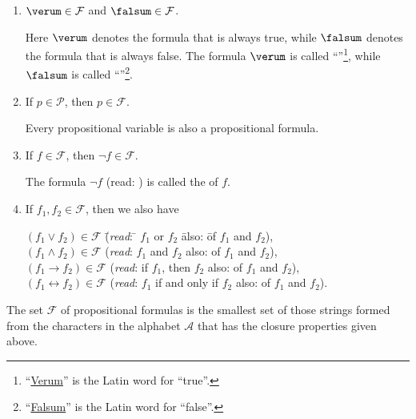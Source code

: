 \begin{enumerate}
\item $\verum \in \mathcal{F}$ and $\falsum \in \mathcal{F}$.

      Here $\verum$   denotes the formula that is always true, while $\falsum$
        denotes the formula that is always false.
      The formula $\verum$ is called
      ``''\footnote{``\href{https://translate.google.com/?sl=la&tl=en&text=falsum&op=translate&hl=en}{Verum}''
        is the Latin word for ``true''.},  while $\falsum$ is called 
      ``''\footnote{``\href{https://translate.google.com/?sl=la&tl=en&text=falsum&op=translate&hl=en}{Falsum}''
        is the Latin word for ``false''.}.  
\item If $p \in \mathcal{P}$, then  $p \in \mathcal{F}$.

      Every propositional variable is also a propositional formula.
\item If $f \in \mathcal{F}$, then  $\neg f \in \mathcal{F}$.

      The formula  $\neg f$  (read: ) is called the  of $f$.
\item If $f_1, f_2 \in \mathcal{F}$, then we also have
      \begin{tabbing}
        $(f_1 \vee f_2) \in \mathcal{F}$  \hspace*{0.5cm} \= (\textsl{read}: \quad \= $f_1$ or $f_2$ \hspace*{2.3cm} \=
         also: \qquad\= of $f_1$ and $f_2$), \\
        $(f_1 \wedge f_2) \in \mathcal{F}$  \> (\textsl{read}: \> $f_1$ and $f_2$ \>
         also: \> of $f_1$ and $f_2$), \\
        $(f_1 \rightarrow f_2) \in \mathcal{F}$  \> (\textsl{read}:       \> if $f_1$, then $f_2$ \>
         also: \> of $f_1$ and $f_2$), \\
        $(f_1 \leftrightarrow f_2) \in \mathcal{F}$  \>
        (\textsl{read}:       \> $f_1$ if and only if $f_2$ \>
        also: \> of $f_1$ and $f_2$).            
      \end{tabbing}
\end{enumerate}
The set  $\mathcal{F}$ of propositional formulas is the smallest set of those strings formed from the characters
in the alphabet $\mathcal{A}$ that has the closure properties given above.


